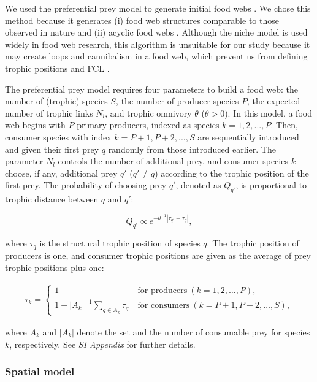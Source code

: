 \documentclass[11pt, class=article, crop=false]{standalone}
\begin{document}
We used the preferential prey model to generate initial food webs \citep{johnson_trophic_2014}.
We chose this method because it generates (i) food web structures comparable to those observed in nature and (ii) acyclic food webs \citep{shibasaki_food_2024}.
Although the niche model \citep{williams_simple_2000} is used widely in food web research, this algorithm is unsuitable for our study because it may create loops and cannibalism in a food web, which prevent us from defining trophic positions and FCL \citep{shibasaki_food_2024}.

The preferential prey model requires four parameters to build a food web: the number of (trophic) species $S$, the number of producer species $P$, the expected number of trophic links $N_l$, and trophic omnivory $\theta$ ($\theta > 0$).
In this model, a food web begins with $P$ primary producers, indexed as species $k = 1, 2, ..., P$.
Then, consumer species with index $k = P + 1, P + 2, ..., S$ are sequentially introduced and given their first prey $q$ randomly from those introduced earlier.
The parameter $N_l$ controls the number of additional prey, and consumer species $k$ choose, if any, additional prey $q'$ ($q' \ne q$) according to the trophic position of the first prey.
The probability of choosing prey $q'$, denoted as $Q_{q'}$, is proportional to trophic distance between $q$ and $q'$:

\begin{equation}
    Q_{q'} \propto e^{-\theta^{-1} |\tau_{q'} - \tau_q|},
\end{equation}

where $\tau_q$ is the structural trophic position of species $q$.
The trophic position of producers is one, and
consumer trophic positions are given as the average of prey trophic positions plus one:

\begin{align}
    \tau_k = 
    \begin{cases}
    1 & ~\text{for producers}~ (k=1, 2, \ldots, P),\\
    1 + |A_{k}|^{-1} \sum_{q \in A_{k}} \tau_q & ~\text{for consumers}~ (k = P+1, P+2, \ldots, S),
    \end{cases}
\end{align}

where $A_{k}$ and $|A_{k}|$ denote the set and the number of consumable prey for species $k$, respectively.
See \textit{SI Appendix} for further details.

\subsubsection{Spatial model}
\end{document}
